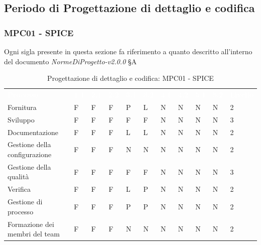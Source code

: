 \subsection{Periodo di Progettazione di dettaglio e codifica}
\subsubsection{MPC01 - SPICE}
Ogni sigla presente in questa sezione fa riferimento a quanto descritto all'interno del documento \textit{NormeDiProgetto-v2.0.0} §A


\begin{table}[H]
        \renewcommand{\arraystretch}{1.5}
        \begin{tabular}{ m{}<{\centering}  m{}<{\centering} m{}<{\centering} m{}<{\centering} m{}<{\centering} m{}<{\centering} m{}<{\centering} m{}<{\centering} m{}<{\centering} m{}<{\centering} m{}<{\centering}}
	\rowcolor{darkblue}
	\textcolor{white}{\textbf{Processo}} &\textcolor{white}{\textbf{1.1}} &\textcolor{white}{\textbf{2.1}} &\textcolor{white}{\textbf{2.2}} &\textcolor{white}{\textbf{3.1}} &\textcolor{white}{\textbf{3.2}} &\textcolor{white}{\textbf{4.1}} &\textcolor{white}{\textbf{4.2}} &\textcolor{white}{\textbf{5.1}} &\textcolor{white}{\textbf{5.2}} &\textcolor{white}{\textbf{Livello}}\\ 


    Fornitura & F & F & F & P & L & N & N & N & N & 2 \\
    Sviluppo & F & F & F & F & F & N & N & N & N & 3 \\
    Documentazione & F & F & F & L & L & N & N & N & N & 2 \\
    Gestione della configurazione & F & F & F & N & N & N & N & N & N & 2 \\
    Gestione della qualità & F & F & F & F & F & N & N & N & N & 3 \\
    Verifica & F & F & F & L & P & N & N & N & N & 2 \\
   
    Gestione di processo & F & F & F & P & P & N & N & N & N & 2 \\
    Formazione dei membri del team & F & F & F & N & N & N & N & N & N & 2 \\
    
\end{tabular}       
\caption{Progettazione di dettaglio e codifica: MPC01 - SPICE}
\end{table}

